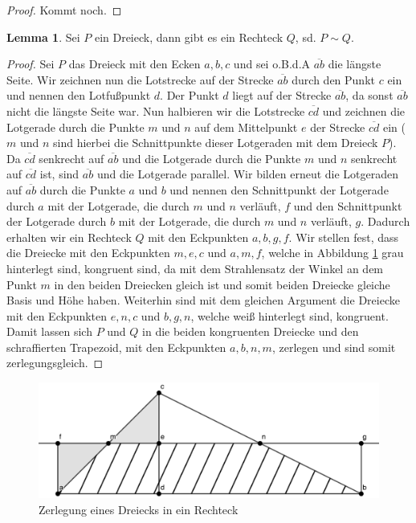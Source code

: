 \documentclass[11pt,titlepage]{article}
\theoremstyle{definition}
\newtheorem{lemma}[theorem]{Lemma}
\theoremstyle{remark}
\begin{document}
	\begin{proof}
		Kommt noch.
	\end{proof}
	
	\begin{lemma}
		Sei $P$ ein Dreieck, dann gibt es ein Rechteck $Q$, sd. $P\sim Q$. \label{lemma:dreieck,rechteck}
	\end{lemma}
	
	\begin{proof}
		Sei $P$ das Dreieck mit den Ecken $a,b,c$ und sei o.B.d.A $\overline{ab}$ die längste Seite. Wir zeichnen 
		nun die Lotstrecke auf der Strecke $\overline{ab}$ durch den Punkt $c$ ein und nennen den Lotfußpunkt $d$. 
		Der Punkt $d$ liegt auf der Strecke $\overline{ab}$, da sonst $\overline{ab}$ nicht die längste Seite war. 
		Nun halbieren wir die Lotstrecke $\overline{cd}$ und zeichnen die Lotgerade durch die Punkte $m$ und $n$ 
		auf dem Mittelpunkt $e$ der Strecke $\overline{cd}$ ein ($m$ und $n$ sind hierbei die Schnittpunkte 
		dieser Lotgeraden mit dem Dreieck $P$). Da $\overline{cd}$ senkrecht auf $\overline{ab}$ und die Lotgerade 
		durch die Punkte $m$ und $n$ 
		senkrecht auf $\overline{cd}$ ist, sind $\overline{ab}$ und die Lotgerade parallel. Wir bilden erneut die 
		Lotgeraden auf $\overline{ab}$ durch die Punkte $a$ und $b$ und nennen den Schnittpunkt der Lotgerade 
		durch $a$ mit der Lotgerade, die durch $m$ und $n$ verläuft, $f$ und den Schnittpunkt der Lotgerade durch 
		$b$ mit der Lotgerade, die durch $m$ und $n$ verläuft, $g$. Dadurch erhalten wir ein Rechteck $Q$ mit den 
		Eckpunkten $a,b,g,f$. Wir stellen fest, dass die Dreiecke mit den Eckpunkten $m,e,c$ und $a,m,f$, welche in 
		Abbildung \ref{Abb.1} grau hinterlegt sind, kongruent sind, da mit dem Strahlensatz der Winkel an dem 
		Punkt $m$ in den beiden Dreiecken gleich ist und somit beiden Dreiecke gleiche Basis und Höhe haben. 
		Weiterhin sind mit dem gleichen Argument die Dreiecke mit den Eckpunkten $e,n,c$ und $b,g,n$, welche weiß 
		hinterlegt sind, kongruent. Damit lassen sich $P$ und $Q$ in die beiden 
		kongruenten Dreiecke und den schraffierten Trapezoid, mit den Eckpunkten $a,b,n,m$, zerlegen und sind somit 
		zerlegungsgleich.
	\end{proof}
	
	\begin{figure}[!htbp]
		\centering
		\includegraphics[scale=1.6]{DreieckLemma}
		\caption{Zerlegung eines Dreiecks in ein Rechteck}
		\label{Abb.1}
	\end{figure}
	
\end{document}
